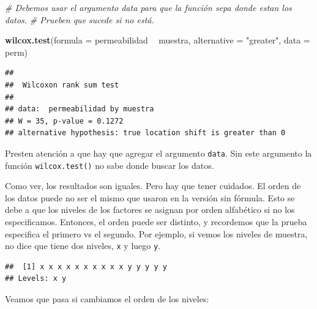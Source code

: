 \documentclass[]{book}
\newenvironment{Shaded}{\begin{snugshade}}{\end{snugshade}}
\newcommand{\CommentTok}[1]{\textcolor[rgb]{0.56,0.35,0.01}{\textit{#1}}}
\newcommand{\DataTypeTok}[1]{\textcolor[rgb]{0.13,0.29,0.53}{#1}}
\newcommand{\KeywordTok}[1]{\textcolor[rgb]{0.13,0.29,0.53}{\textbf{#1}}}
\newcommand{\NormalTok}[1]{#1}
\newcommand{\OperatorTok}[1]{\textcolor[rgb]{0.81,0.36,0.00}{\textbf{#1}}}
\newcommand{\StringTok}[1]{\textcolor[rgb]{0.31,0.60,0.02}{#1}}
\theoremstyle{definition}
\theoremstyle{definition}
\theoremstyle{definition}
\theoremstyle{remark}
\begin{document}
\begin{Shaded}
\begin{Highlighting}[]
\CommentTok{# Debemos usar el argumento data para que la función sepa donde estan los datos.}
\CommentTok{# Prueben que sucede si no está.}

\KeywordTok{wilcox.test}\NormalTok{(}\DataTypeTok{formula =}\NormalTok{ permeabilidad }\OperatorTok{~}\StringTok{ }\NormalTok{muestra, }\DataTypeTok{alternative =} \StringTok{"greater"}\NormalTok{, }\DataTypeTok{data =}\NormalTok{ perm)}
\end{Highlighting}
\end{Shaded}

\begin{verbatim}
## 
##  Wilcoxon rank sum test
## 
## data:  permeabilidad by muestra
## W = 35, p-value = 0.1272
## alternative hypothesis: true location shift is greater than 0
\end{verbatim}

Presten atención a que hay que agregar el argumento \texttt{data}. Sin
este argumento la función \texttt{wilcox.test()} no sabe donde buscar
los datos.

Como ver, los resultados son iguales. Pero hay que tener cuidados. El
orden de los datos puede no ser el mismo que usaron en la versión sin
fórmula. Esto se debe a que los niveles de los factores se asignan por
orden alfabético si no los especificamos. Entonces, el orden puede ser
distinto, y recordemos que la prueba especifica el primero vs el
segundo. Por ejemplo, si vemos los niveles de muestra, no dice que tiene
dos niveles, \texttt{x} y luego \texttt{y}.

\begin{Shaded}
\end{Shaded}

\begin{verbatim}
##  [1] x x x x x x x x x x y y y y y
## Levels: x y
\end{verbatim}

Veamos que pasa si cambiamos el orden de los niveles:

\begin{Shaded}
\end{Shaded}
\end{document}
